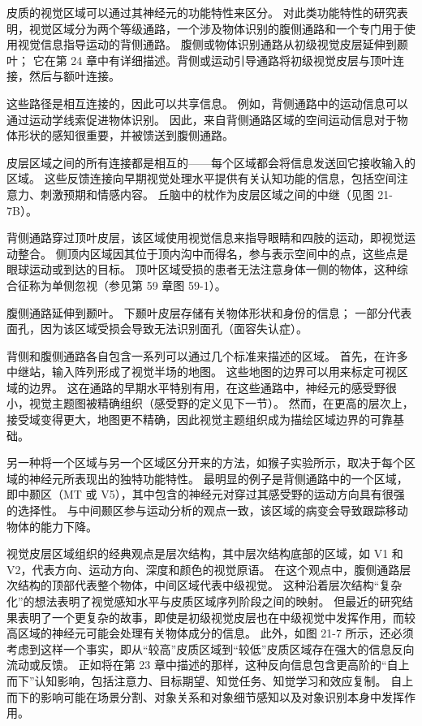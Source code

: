 皮质的视觉区域可以通过其神经元的功能特性来区分。 对此类功能特性的研究表明，视觉区域分为两个等级通路，一个涉及物体识别的腹侧通路和一个专门用于使用视觉信息指导运动的背侧通路。 腹侧或物体识别通路从初级视觉皮层延伸到颞叶； 它在第 24 章中有详细描述。背侧或运动引导通路将初级视觉皮层与顶叶连接，然后与额叶连接。

这些路径是相互连接的，因此可以共享信息。 例如，背侧通路中的运动信息可以通过运动学线索促进物体识别。 因此，来自背侧通路区域的空间运动信息对于物体形状的感知很重要，并被馈送到腹侧通路。

皮层区域之间的所有连接都是相互的——每个区域都会将信息发送回它接收输入的区域。 这些反馈连接向早期视觉处理水平提供有关认知功能的信息，包括空间注意力、刺激预期和情感内容。 丘脑中的枕作为皮层区域之间的中继（见图 21-7B）。

背侧通路穿过顶叶皮层，该区域使用视觉信息来指导眼睛和四肢的运动，即视觉运动整合。 侧顶内区域因其位于顶内沟中而得名，参与表示空间中的点，这些点是眼球运动或到达的目标。 顶叶区域受损的患者无法注意身体一侧的物体，这种综合征称为单侧忽视（参见第 59 章图 59-1）。

腹侧通路延伸到颞叶。 下颞叶皮层存储有关物体形状和身份的信息； 一部分代表面孔，因为该区域受损会导致无法识别面孔（面容失认症）。

背侧和腹侧通路各自包含一系列可以通过几个标准来描述的区域。 首先，在许多中继站，输入阵列形成了视觉半场的地图。 这些地图的边界可以用来标定可视区域的边界。 这在通路的早期水平特别有用，在这些通路中，神经元的感受野很小，视觉主题图被精确组织（感受野的定义见下一节）。 然而，在更高的层次上，接受域变得更大，地图更不精确，因此视觉主题组织成为描绘区域边界的可靠基础。

另一种将一个区域与另一个区域区分开来的方法，如猴子实验所示，取决于每个区域的神经元所表现出的独特功能特性。 最明显的例子是背侧通路中的一个区域，即中颞区（MT 或 V5），其中包含的神经元对穿过其感受野的运动方向具有很强的选择性。 与中间颞区参与运动分析的观点一致，该区域的病变会导致跟踪移动物体的能力下降。

视觉皮层区域组织的经典观点是层次结构，其中层次结构底部的区域，如 V1 和 V2，代表方向、运动方向、深度和颜色的视觉原语。 在这个观点中，腹侧通路层次结构的顶部代表整个物体，中间区域代表中级视觉。 这种沿着层次结构“复杂化”的想法表明了视觉感知水平与皮质区域序列阶段之间的映射。 但最近的研究结果表明了一个更复杂的故事，即使是初级视觉皮层也在中级视觉中发挥作用，而较高区域的神经元可能会处理有关物体成分的信息。 此外，如图 21-7 所示，还必须考虑到这样一个事实，即从“较高”皮质区域到“较低”皮质区域存在强大的信息反向流动或反馈。 正如将在第 23 章中描述的那样，这种反向信息包含更高阶的“自上而下”认知影响，包括注意力、目标期望、知觉任务、知觉学习和效应复制。 自上而下的影响可能在场景分割、对象关系和对象细节感知以及对象识别本身中发挥作用。


